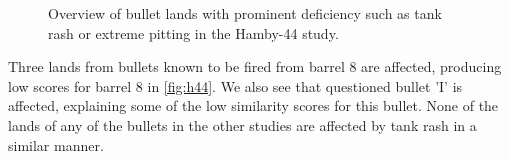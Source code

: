 \documentclass[doubleblind]{elsarticle}\usepackage[]{graphicx}\usepackage[]{color}
\newenvironment{knitrout}{}{} %
\begin{document}
\begin{knitrout}
\begin{figure}
\newline
{}
\caption[Overview of bullet lands with prominent deficiency such as tank rash or extreme pitting in the Hamby-44 study]{Overview of bullet lands with prominent deficiency such as tank rash or extreme pitting in the Hamby-44 study.}\label{fig:tankrash}
\end{figure}


\end{knitrout}

Three lands from bullets known to be fired from barrel 8 are affected, producing low scores for barrel 8 in \autoref{fig:h44}. We also see that questioned bullet 'I' is affected, explaining some of the low similarity scores for this bullet.
None of the lands of any of the bullets in the other studies are affected by tank rash in a similar manner.
\end{document}
